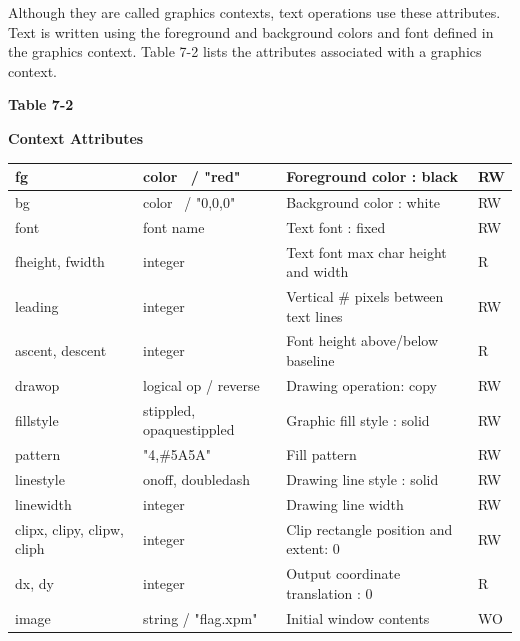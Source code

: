 Although they are called graphics contexts, text operations use these
attributes. Text is written using the foreground and background colors
and font defined in the graphics context. Table 7-2 lists the
attributes associated with a graphics context.

{\centering\sffamily\bfseries
Table 7-2
\par}

{\centering\sffamily\bfseries
Context Attributes
\par}

\begin{center}
\begin{supertabular}{|m{1.076in}|m{1.5in}|m{2.58in}|m{0.448in}|}
fg &
color \ / "red" &
Foreground color : black &
RW\\\hline
bg &
color \ / "0,0,0" &
Background color : white &
RW\\\hline
font &
font name &
Text font : fixed &
RW\\\hline
fheight, fwidth &
integer &
Text font max char height and width &
R\\\hline
leading &
integer &
Vertical \# pixels between text lines &
RW\\\hline
ascent, descent &
integer &
Font height above/below baseline &
R\\\hline
drawop &
logical op / reverse  &
Drawing operation: copy &
RW\\\hline
fillstyle &
stippled, opaquestippled &
Graphic fill style : solid &
RW\\\hline
pattern &
"4,\#5A5A" &
Fill pattern &
RW\\\hline
linestyle &
onoff, doubledash &
Drawing line style : solid  &
RW\\\hline
linewidth &
integer &
Drawing line width &
RW\\\hline
clipx, clipy, clipw, cliph &
integer &
Clip rectangle position and extent: 0 &
RW\\\hline
dx, dy &
integer &
Output coordinate translation : 0 &
R\\\hline
image &
string / "flag.xpm" &
Initial window contents &
WO\\\hline
\end{supertabular}
\end{center}

